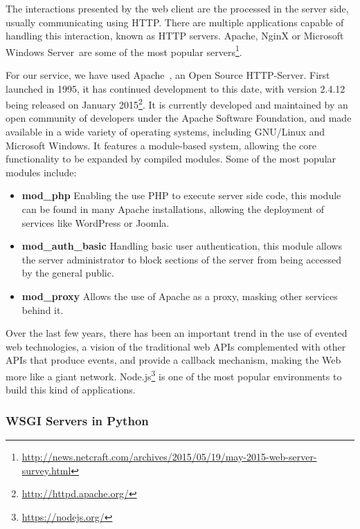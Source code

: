 
The interactions presented by the web client are the processed in the server side, usually communicating using HTTP. There are multiple applications capable of handling this interaction, known as HTTP servers. Apache, NginX or Microsoft Windows Server\textregistered~are some of the most popular servers\footnote{\url{http://news.netcraft.com/archives/2015/05/19/may-2015-web-server-survey.html}}. 

For our service, we have used Apache~\cite{apacheabout}, an Open Source HTTP-Server. First launched in 1995, it has continued development to this date, with version 2.4.12 being released on January 2015\footnote{\url{http://httpd.apache.org/}}. It is currently developed and maintained by an open community of developers under the Apache Software Foundation, and made available in a wide variety of operating systems, including GNU/Linux and Microsoft Windows\textregistered. It features a module-based system, allowing the core functionality to be expanded by compiled modules. Some of the most popular modules include:

\begin{itemize}%
 \item \textbf{mod\_php} Enabling the use PHP to execute server side code, this module can be found in many Apache installations, allowing the deployment of services like WordPress or Joomla.
 \item \textbf{mod\_auth\_basic} Handling basic user authentication, this module allows the server administrator to block sections of the server from being accessed by the general public.
 \item \textbf{mod\_proxy} Allows the use of Apache as a proxy, masking other services behind it.
\end{itemize}

Over the last few years, there has been an important trend in the use of evented web technologies, a vision of the traditional web APIs complemented with other APIs that produce events, and provide a callback mechanism, making the Web more like a giant network. Node.js\footnote{\url{https://nodejs.org/}} is one of the most popular environments to build this kind of applications.

\subsubsection{WSGI Servers in Python}

